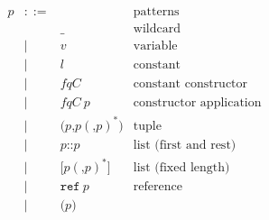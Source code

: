 \documentclass[12pt,a4paper]{book}
\newcommand{\gramsep}{|}
\begin{document}
\[
\begin{array}{lcll}
p & ::= & &\mbox{patterns}\\
&&\texttt{\_}&\mbox{wildcard}\\
&\gramsep& v &\mbox{variable}\\
&\gramsep& l &\mbox{constant}\\
&\gramsep& \mathit{fqC} & \mbox{constant constructor}\\
&\gramsep& \mathit{fqC}\ p & \mbox{constructor application}\\
&\gramsep& \texttt{(}p\texttt{,}p(\texttt{,}p)^*\texttt{)}&\mbox{tuple}\\
&\gramsep& p \texttt{::} p&\mbox{list (first and rest)}\\
&\gramsep& \texttt{[}p(\texttt{,}p)^*\texttt{]}&\mbox{list (fixed length)}\\
 &\gramsep& \texttt{ref}\ p&\mbox{reference}\\
 &\gramsep& \texttt{(}p\texttt{)}
 \end{array}
\]
\end{document}

